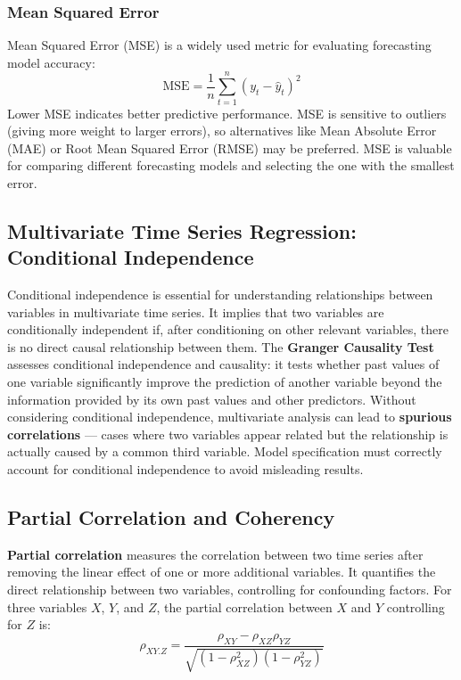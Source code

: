 \documentclass[11pt,a4paper]{article}
\begin{document}
\subsubsection{Mean Squared Error}

Mean Squared Error (MSE) is a widely used metric for evaluating forecasting model accuracy:
\[
\text{MSE} = \frac{1}{n} \sum_{t=1}^n (y_t - \hat{y}_t)^2
\]
Lower MSE indicates better predictive performance. MSE is sensitive to outliers (giving more weight to larger errors), so alternatives like Mean Absolute Error (MAE) or Root Mean Squared Error (RMSE) may be preferred. MSE is valuable for comparing different forecasting models and selecting the one with the smallest error.

\subsection{Multivariate Time Series Regression: Conditional Independence}

Conditional independence is essential for understanding relationships between variables in multivariate time series. It implies that two variables are conditionally independent if, after conditioning on other relevant variables, there is no direct causal relationship between them. The \textbf{Granger Causality Test} assesses conditional independence and causality: it tests whether past values of one variable significantly improve the prediction of another variable beyond the information provided by its own past values and other predictors. Without considering conditional independence, multivariate analysis can lead to \textbf{spurious correlations} --- cases where two variables appear related but the relationship is actually caused by a common third variable. Model specification must correctly account for conditional independence to avoid misleading results.

\subsection{Partial Correlation and Coherency}

\textbf{Partial correlation} measures the correlation between two time series after removing the linear effect of one or more additional variables. It quantifies the direct relationship between two variables, controlling for confounding factors. For three variables $X$, $Y$, and $Z$, the partial correlation between $X$ and $Y$ controlling for $Z$ is:
\[
\rho_{XY.Z} = \frac{\rho_{XY} - \rho_{XZ}\rho_{YZ}}{\sqrt{(1-\rho_{XZ}^2)(1-\rho_{YZ}^2)}}
\]
\end{document}
